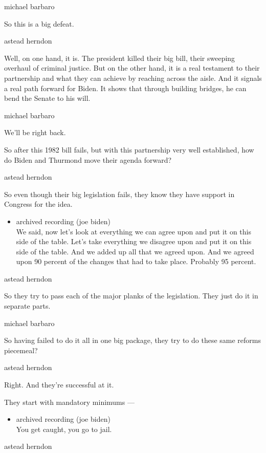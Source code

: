 michael barbaro

So this is a big defeat.

astead herndon

Well, on one hand, it is. The president killed their big bill, their
sweeping overhaul of criminal justice. But on the other hand, it is a
real testament to their partnership and what they can achieve by
reaching across the aisle. And it signals a real path forward for Biden.
It shows that through building bridges, he can bend the Senate to his
will.

michael barbaro

We'll be right back.

So after this 1982 bill fails, but with this partnership very well
established, how do Biden and Thurmond move their agenda forward?

astead herndon

So even though their big legislation fails, they know they have support
in Congress for the idea.

\begin{itemize}
\tightlist
\item
  archived recording (joe biden)\\
  We said, now let's look at everything we can agree upon and put it on
  this side of the table. Let's take everything we disagree upon and put
  it on this side of the table. And we added up all that we agreed upon.
  And we agreed upon 90 percent of the changes that had to take place.
  Probably 95 percent.
\end{itemize}

astead herndon

So they try to pass each of the major planks of the legislation. They
just do it in separate parts.

michael barbaro

So having failed to do it all in one big package, they try to do these
same reforms piecemeal?

astead herndon

Right. And they're successful at it.

They start with mandatory minimums ---

\begin{itemize}
\tightlist
\item
  archived recording (joe biden)\\
  You get caught, you go to jail.
\end{itemize}

astead herndon

